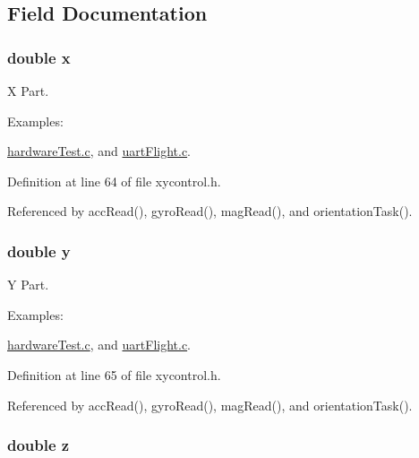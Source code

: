 \subsection{Field Documentation}
\hypertarget{struct_vector3f_af88b946fb90d5f08b5fb740c70e98c10}{
\subsubsection[{x}]{\setlength{\rightskip}{0pt plus 5cm}double x}}\label{struct_vector3f_af88b946fb90d5f08b5fb740c70e98c10}


X Part. 

\begin{Desc}
\item[Examples\-: ]\par
\hyperlink{hardware_test_8c-example}{hardware\-Test.\-c}, and \hyperlink{uart_flight_8c-example}{uart\-Flight.\-c}.\end{Desc}


Definition at line 64 of file xycontrol.\-h.



Referenced by acc\-Read(), gyro\-Read(), mag\-Read(), and orientation\-Task().

\hypertarget{struct_vector3f_ab927965981178aa1fba979a37168db2a}{
\subsubsection[{y}]{\setlength{\rightskip}{0pt plus 5cm}double y}}\label{struct_vector3f_ab927965981178aa1fba979a37168db2a}


Y Part. 

\begin{Desc}
\item[Examples\-: ]\par
\hyperlink{hardware_test_8c-example}{hardware\-Test.\-c}, and \hyperlink{uart_flight_8c-example}{uart\-Flight.\-c}.\end{Desc}


Definition at line 65 of file xycontrol.\-h.



Referenced by acc\-Read(), gyro\-Read(), mag\-Read(), and orientation\-Task().

\hypertarget{struct_vector3f_ab3e6ed577a7c669c19de1f9c1b46c872}{
\subsubsection[{z}]{\setlength{\rightskip}{0pt plus 5cm}double z}}\label{struct_vector3f_ab3e6ed577a7c669c19de1f9c1b46c872}


